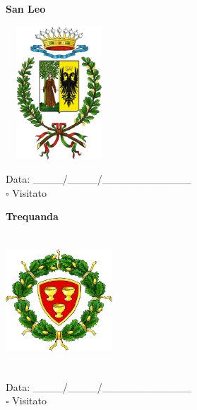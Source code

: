 \documentclass[a5paper,12pt]{article}
\begin{document}
\vspace{0.7cm}

\noindent
\begin{minipage}[t]{0.45\textwidth}
    \begin{center}
        \textbf{San Leo}
    \end{center}
    \vspace{-0.5cm} %
    \begin{center}
        \includegraphics[height= 5cm, width=4cm]{Emilia Romagna/Stemma San Leo.png}
    \end{center}
    \vspace{-0.4cm} %
    \begin{flushleft}
        Data: \_\_\_\_/\_\_\_\_/\_\_\_\_\_\_\_\_\_\_\_\_ \\
        $\square$ Visitato
    \end{flushleft}
\end{minipage}
\hfill
\noindent
\begin{minipage}[t]{0.45\textwidth}
    \begin{center}
        \textbf{Trequanda}
    \end{center}
    \vspace{-0.5cm} %
    \begin{center}
        \includegraphics[height= 5cm, width=4cm]{Toscana/Stemma Trequanda.png}
    \end{center}
    \vspace{-0.4cm} %
    \begin{flushleft}
        Data: \_\_\_\_/\_\_\_\_/\_\_\_\_\_\_\_\_\_\_\_\_ \\
        $\square$ Visitato
    \end{flushleft}
\end{minipage}
\end{document}
